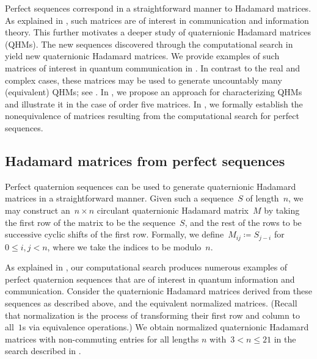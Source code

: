 \documentclass[12pt]{article}
\numberwithin{equation}{section}
\newcommand{\eqdef}{\coloneqq}
\begin{document}
Perfect sequences correspond in a straightforward manner to Hadamard matrices. As explained in , such matrices are of interest in communication and information theory. This further motivates a deeper study of quaternionic Hadamard matrices (QHMs). The new sequences discovered through the computational search in  yield new quaternionic Hadamard matrices. We provide examples of such matrices of interest in quantum communication in . In contrast to the real and complex cases, these matrices may be used to generate uncountably many (equivalent) QHMs; see . In , we propose an approach for characterizing QHMs and illustrate it in the case of order five matrices. In , we formally establish the nonequivalence of matrices resulting from the computational search for perfect sequences.

\subsection{Hadamard matrices from perfect sequences} 
\label{subsection:patterns}

Perfect quaternion sequences can be used to generate quaternionic Hadamard matrices in a straightforward manner. Given such a sequence~$S$ of length~$n$, we may construct an~$n \times n$ circulant quaternionic Hadamard matrix~$M$ by taking the first row of the matrix to be the sequence~$S$, and the rest of the rows to be successive cyclic shifts of the first row. Formally, we define~$M_{ij} \eqdef S_{j-i}$ for~$0\leq i,j<n$, where we take the indices to be modulo~$n$.

As explained in , our computational search produces numerous
examples of perfect quaternion sequences that are of interest in quantum information and communication.
Consider the quaternionic Hadamard matrices derived from these sequences as described above, and the equivalent normalized matrices. (Recall that normalization is the process of transforming their first row and column to all~$1$s via equivalence operations.)
We obtain normalized quaternionic Hadamard matrices with non-commuting entries
for all lengths $n$ with~$3 < n \le 21$ in the search described in .
\end{document}
